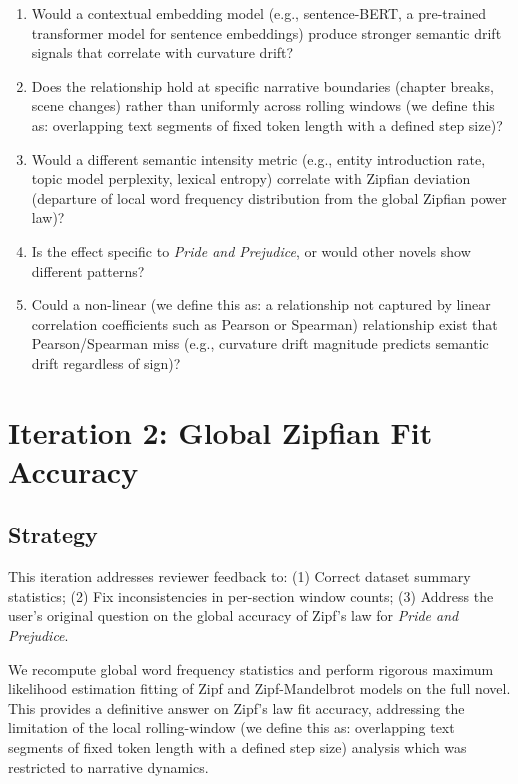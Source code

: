 \documentclass[11pt,letterpaper]{article}
\begin{document}
\begin{enumerate}
\item Would a contextual embedding model (e.g., sentence-BERT, a pre-trained transformer model for sentence embeddings) produce stronger semantic drift signals that correlate with curvature drift?
\item Does the relationship hold at specific narrative boundaries (chapter breaks, scene changes) rather than uniformly across rolling windows (we define this as: overlapping text segments of fixed token length with a defined step size)?
\item Would a different semantic intensity metric (e.g., entity introduction rate, topic model perplexity, lexical entropy) correlate with Zipfian deviation (departure of local word frequency distribution from the global Zipfian power law)?
\item Is the effect specific to \textit{Pride and Prejudice}, or would other novels show different patterns?
\item Could a non-linear (we define this as: a relationship not captured by linear correlation coefficients such as Pearson or Spearman) relationship exist that Pearson/Spearman miss (e.g., curvature drift magnitude predicts semantic drift regardless of sign)?
\end{enumerate}

\newpage

\section{Iteration 2: Global Zipfian Fit Accuracy}

\subsection{Strategy}

This iteration addresses reviewer feedback to: (1) Correct dataset summary statistics; (2) Fix inconsistencies in per-section window counts; (3) Address the user's original question on the global accuracy of Zipf's law for \textit{Pride and Prejudice}.

We recompute global word frequency statistics and perform rigorous maximum likelihood estimation fitting of Zipf and Zipf-Mandelbrot models on the full novel. This provides a definitive answer on Zipf's law fit accuracy, addressing the limitation of the local rolling-window (we define this as: overlapping text segments of fixed token length with a defined step size) analysis which was restricted to narrative dynamics.
\end{document}
